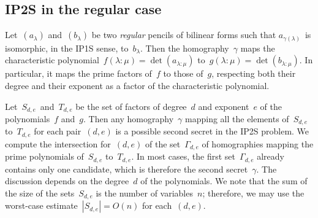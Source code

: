 \documentclass{lms}
\def\abs#1{\left|#1\right|}
\def\mat#1{\begin{pmatrix}#1\end{pmatrix}}
\def\smat{\def\arraystretch{.66}\mat}
\def\card#1{\abs{#1}}
\DeclareMathOperator\GL{GL}
\begin{document}
% 
% 


\subsection{IP2S in the regular case}

Let~$(a_{λ})$ and~$(b_{λ})$ be two \emph{regular} pencils of bilinear
forms such that $a_{γ(λ)}$~is isomorphic, in the IP1S sense, to~$b_{λ}$.
Then the homography~$γ$ maps the characteristic polynomial~$f(λ:μ)
= \det (a_{λ:μ})$ to~$g(λ:μ) = \det (b_{λ:μ})$. In particular, it maps the
prime factors of~$f$ to those of~$g$, respecting both their degree and
their exponent as a factor of the characteristic polynomial.

Let~$S_{d,e}$~and~$T_{d,e}$ be the set of factors of degree~$d$ and
exponent~$e$ of the polynomials~$f$ and~$g$. Then any homography~$γ$
mapping all the elements of~$S_{d,e}$ to~$T_{d,e}$ for each pair~$(d,e)$
is a possible second secret in the IP2S problem. We compute the
intersection for~$(d,e)$ of the set~$Γ_{d,e}$ of homographies mapping the
prime polynomials of~$S_{d,e}$ to~$T_{d,e}$. In most cases, the first
set~$Γ_{d,e}$ already contains only one candidate, which is therefore the
second secret~$γ$. The discussion depends on the degree~$d$ of the
polynomials. We note that the sum of the size of the sets~$S_{d,e}$ is
the number of variables~$n$; therefore, we may use the worst-case
estimate~$\card{S_{d,e}} = O(n)$ for each~$(d,e)$.
\end{document}
